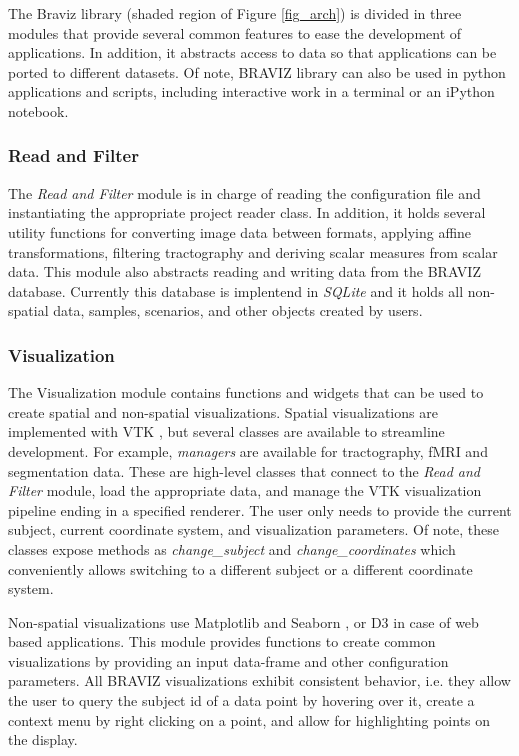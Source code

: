 \documentclass{frontiersHLTH}
\begin{document}
The Braviz library (shaded region of Figure \ref{fig_arch}) is divided in three modules that provide several common features to ease the development of applications. In addition, it abstracts access to data so that applications can be ported to different datasets. Of note, BRAVIZ library can also be used in python applications and scripts, including interactive work in a terminal or an iPython notebook.

\subsubsection{Read and Filter}

The \emph{Read and Filter} module is in charge of reading the configuration file and instantiating the appropriate project reader class. In addition, it holds several utility functions for converting image data between formats, applying affine transformations, filtering tractography and deriving scalar measures from scalar data. This module also abstracts reading and writing data from the BRAVIZ database. Currently this database is implentend in \emph{SQLite} \cite{hipp_sqlite_2015} and it holds all non-spatial data, samples, scenarios, and other objects created by users.

\subsubsection{Visualization}

The Visualization module contains functions and widgets that can be used to create spatial and non-spatial visualizations. Spatial visualizations are implemented with VTK \cite{schroeder_design_1996} , but several classes are available to streamline development. For example, \emph{managers} are available for tractography, fMRI and segmentation data. These are high-level classes that connect to the \emph{Read and Filter} module, load the appropriate data, and manage the VTK visualization pipeline ending in a specified renderer. The user only needs to provide the current subject, current coordinate system, and visualization parameters. 
Of note, these classes expose methods as \emph{change\_subject} and \emph{change\_coordinates} which conveniently allows switching to a different subject or a different coordinate system.

Non-spatial visualizations use Matplotlib \cite{hunter_matplotlib:_2007} and Seaborn \cite{michael_waskom_seaborn:_2015}, or D3  \cite{bostock_d3_2011} in case of web based applications. This module provides functions to create common visualizations by providing an input data-frame and other configuration parameters. All BRAVIZ visualizations exhibit consistent behavior, i.e. they  allow the user to query the subject id of a data point by hovering over it, create a context menu by right clicking on a point, and allow for highlighting points on the display. 
\end{document}
